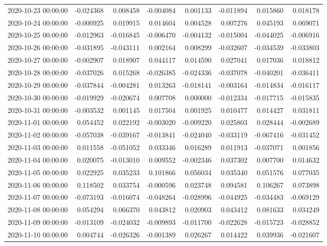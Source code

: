 \begin{tabular}{lrrrrrrr}
2020-10-23 00:00:00 & -0.024368 & 0.008458 & -0.004084 & 0.001133 & -0.011894 & 0.015860 & 0.018178 \\
2020-10-24 00:00:00 & -0.000925 & 0.019915 & 0.014604 & 0.004528 & 0.007276 & 0.045193 & 0.069071 \\
2020-10-25 00:00:00 & -0.012963 & -0.016845 & -0.006470 & -0.004132 & -0.015004 & -0.044025 & -0.006916 \\
2020-10-26 00:00:00 & -0.031895 & -0.043111 & 0.002164 & 0.008299 & -0.032607 & -0.034539 & -0.033803 \\
2020-10-27 00:00:00 & -0.002907 & 0.018907 & 0.044117 & 0.014590 & 0.027041 & 0.017036 & 0.018812 \\
2020-10-28 00:00:00 & -0.037026 & 0.015268 & -0.026385 & -0.024336 & -0.037078 & -0.040201 & -0.036411 \\
2020-10-29 00:00:00 & -0.037844 & -0.004281 & 0.013263 & -0.018141 & -0.003164 & -0.014834 & -0.016117 \\
2020-10-30 00:00:00 & -0.019929 & -0.020674 & 0.007708 & 0.000000 & -0.012334 & -0.017715 & -0.015835 \\
2020-10-31 00:00:00 & -0.003532 & 0.001145 & 0.017504 & 0.001925 & 0.010477 & 0.014427 & 0.031811 \\
2020-11-01 00:00:00 & 0.054452 & 0.022192 & -0.003020 & -0.009220 & 0.025803 & 0.028444 & -0.002689 \\
2020-11-02 00:00:00 & -0.057038 & -0.039167 & -0.013841 & -0.024040 & -0.033119 & -0.067416 & -0.031452 \\
2020-11-03 00:00:00 & 0.011558 & -0.051052 & 0.033346 & 0.016289 & 0.011913 & -0.037071 & 0.001856 \\
2020-11-04 00:00:00 & 0.020075 & -0.013010 & 0.009552 & -0.002346 & 0.037302 & 0.007700 & 0.014632 \\
2020-11-05 00:00:00 & 0.022925 & 0.035233 & 0.101866 & 0.056034 & 0.035340 & 0.051576 & 0.077035 \\
2020-11-06 00:00:00 & 0.118502 & 0.033754 & -0.000596 & 0.023748 & 0.094581 & 0.106267 & 0.073898 \\
2020-11-07 00:00:00 & -0.073193 & -0.016074 & -0.048264 & -0.028996 & -0.044925 & -0.034483 & -0.069129 \\
2020-11-08 00:00:00 & 0.054294 & 0.066370 & 0.043812 & 0.020903 & 0.043412 & 0.081633 & 0.034249 \\
2020-11-09 00:00:00 & -0.013109 & -0.024032 & -0.009893 & -0.011700 & -0.022628 & -0.015723 & -0.028852 \\
2020-11-10 00:00:00 & 0.004744 & -0.026326 & -0.001389 & 0.026267 & 0.014422 & 0.039936 & -0.021607 \\

\end{tabular}
